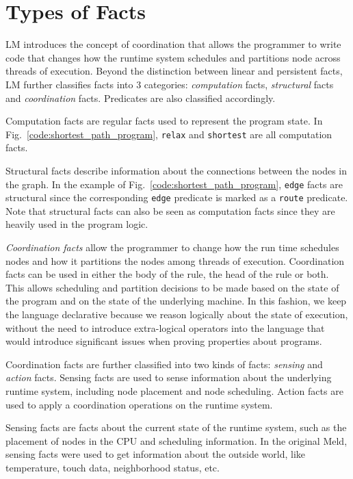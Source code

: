 \section{Types of Facts}

LM introduces the concept of coordination that allows the programmer to write
code that changes how the runtime system schedules and partitions node across
threads of execution. Beyond the distinction between linear and persistent
facts, LM further classifies facts into 3 categories: \emph{computation} facts,
\emph{structural} facts and \emph{coordination} facts.
Predicates are also classified accordingly.

Computation facts are regular facts used to represent the program state. In
Fig.~\ref{code:shortest_path_program}, \texttt{relax} and \texttt{shortest} are
all computation facts.

Structural facts describe information about the connections between the nodes in
the graph.  In the example of Fig.~\ref{code:shortest_path_program},
\texttt{edge} facts are structural since the corresponding \texttt{edge}
predicate is marked as a \texttt{route} predicate. Note that structural facts
can also be seen as computation facts since they are heavily used in the program
logic.

\emph{Coordination facts} allow the programmer to change how the run time
schedules nodes and how it partitions the nodes among threads of execution.
Coordination facts can be used in either the body of the rule, the head of the
rule or both.  This allows scheduling and partition decisions to be made based
on the state of the program and on the state of the underlying machine.  In this
fashion, we keep the language declarative because we reason logically about the
state of execution, without the need to introduce extra-logical operators into
the language that would introduce significant issues when proving properties
about programs.

Coordination facts are further classified into two kinds of facts:
\emph{sensing} and \emph{action} facts. Sensing facts are used to sense
information about the underlying runtime system, including node placement and
node scheduling.  Action facts are used to apply a coordination operations on
the runtime system.


Sensing facts are facts about the current state of the runtime system, such as
the placement of nodes in the CPU and scheduling information. In the original
Meld, sensing facts were used to get information about the outside world, like
temperature, touch data, neighborhood status, etc.

